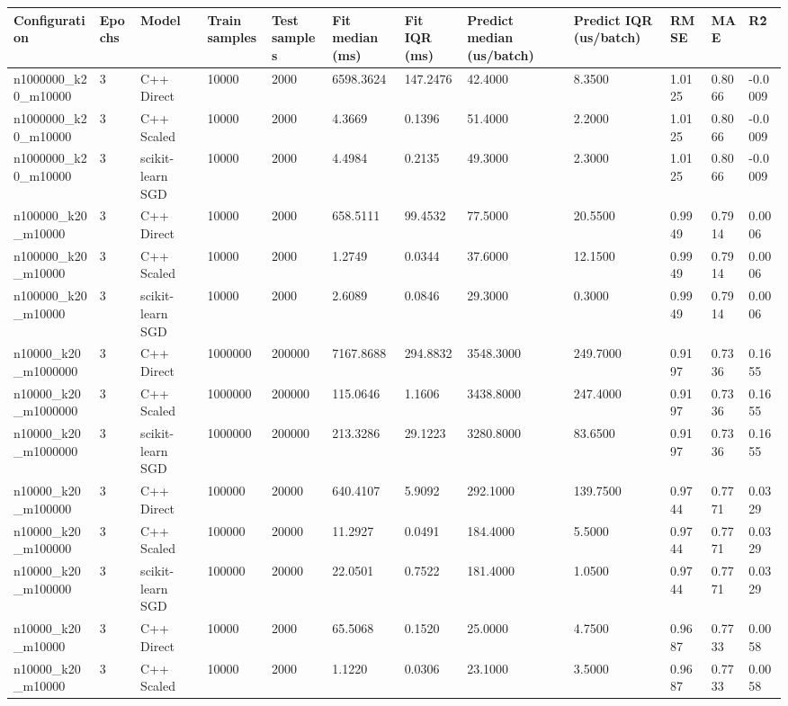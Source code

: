 \begin{table}[htbp]
\centering
\begin{tabular}{llllllllllll}
\toprule
Configuration & Epochs & Model & Train samples & Test samples & Fit median (ms) & Fit IQR (ms) & Predict median (us/batch) & Predict IQR (us/batch) & RMSE & MAE & R\^2 \\
\midrule
n1000000\_k20\_m10000 & 3 & C++ Direct & 10000 & 2000 & 6598.3624 & 147.2476 & 42.4000 & 8.3500 & 1.0125 & 0.8066 & -0.0009 \\
n1000000\_k20\_m10000 & 3 & C++ Scaled & 10000 & 2000 & 4.3669 & 0.1396 & 51.4000 & 2.2000 & 1.0125 & 0.8066 & -0.0009 \\
n1000000\_k20\_m10000 & 3 & scikit-learn SGD & 10000 & 2000 & 4.4984 & 0.2135 & 49.3000 & 2.3000 & 1.0125 & 0.8066 & -0.0009 \\
n100000\_k20\_m10000 & 3 & C++ Direct & 10000 & 2000 & 658.5111 & 99.4532 & 77.5000 & 20.5500 & 0.9949 & 0.7914 & 0.0006 \\
n100000\_k20\_m10000 & 3 & C++ Scaled & 10000 & 2000 & 1.2749 & 0.0344 & 37.6000 & 12.1500 & 0.9949 & 0.7914 & 0.0006 \\
n100000\_k20\_m10000 & 3 & scikit-learn SGD & 10000 & 2000 & 2.6089 & 0.0846 & 29.3000 & 0.3000 & 0.9949 & 0.7914 & 0.0006 \\
n10000\_k20\_m1000000 & 3 & C++ Direct & 1000000 & 200000 & 7167.8688 & 294.8832 & 3548.3000 & 249.7000 & 0.9197 & 0.7336 & 0.1655 \\
n10000\_k20\_m1000000 & 3 & C++ Scaled & 1000000 & 200000 & 115.0646 & 1.1606 & 3438.8000 & 247.4000 & 0.9197 & 0.7336 & 0.1655 \\
n10000\_k20\_m1000000 & 3 & scikit-learn SGD & 1000000 & 200000 & 213.3286 & 29.1223 & 3280.8000 & 83.6500 & 0.9197 & 0.7336 & 0.1655 \\
n10000\_k20\_m100000 & 3 & C++ Direct & 100000 & 20000 & 640.4107 & 5.9092 & 292.1000 & 139.7500 & 0.9744 & 0.7771 & 0.0329 \\
n10000\_k20\_m100000 & 3 & C++ Scaled & 100000 & 20000 & 11.2927 & 0.0491 & 184.4000 & 5.5000 & 0.9744 & 0.7771 & 0.0329 \\
n10000\_k20\_m100000 & 3 & scikit-learn SGD & 100000 & 20000 & 22.0501 & 0.7522 & 181.4000 & 1.0500 & 0.9744 & 0.7771 & 0.0329 \\
n10000\_k20\_m10000 & 3 & C++ Direct & 10000 & 2000 & 65.5068 & 0.1520 & 25.0000 & 4.7500 & 0.9687 & 0.7733 & 0.0058 \\
n10000\_k20\_m10000 & 3 & C++ Scaled & 10000 & 2000 & 1.1220 & 0.0306 & 23.1000 & 3.5000 & 0.9687 & 0.7733 & 0.0058 \\

\end{tabular}
\end{table}

